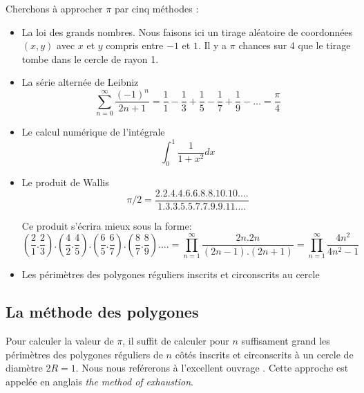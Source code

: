 \documentclass[11pt]{book}
\begin{document}
Cherchons à approcher $\pi$ par cinq méthodes :
\begin{itemize}
	\item La loi des grands nombres. 
	Nous faisons ici un tirage aléatoire de coordonnées $(x,y)$ avec $x$ et $y$ compris entre $-1$ et $1$.
	Il y a  $\pi$ chances sur 4 que le tirage tombe dans le cercle de rayon 1. 
		
	\item La série alternée de Leibniz 
	\[ \sum_{n=0}^\infty \frac{(-1)^n}{2n+1} = \frac{1}{1} -\frac{1}{3}+\frac{1}{5}-\frac{1}{7}+\frac{1}{9} - \dots = \frac{\pi}{4}  \]
	
	\item Le calcul numérique de l'intégrale 
	$$\int_0^1 \frac{1}{1+x^2} dx$$
	
	\item  Le produit de Wallis 
	\[ \pi /2 = \frac{2.2.4.4.6.6.8.8.10.10. ...} {1.3.3.5.5.7.7.9.9.11. ...}\]
	
	Ce produit s'écrira mieux sous la forme:
	\[ ( \frac{2}{1}.\frac{2}{3} ) . (\frac{4}{2}.\frac{4}{5} ).(\frac{6}{5}.\frac{6}{7} ).(\frac{8}{7}.\frac{8}{9} ) . ...  =  \prod_{n=1}^\infty \frac{2n.2n}{(2n-1).(2n+1)} = \prod_{n=1}^\infty \frac{4n^2}{4n^2-1}\]
	
	\item Les périmètres des polygones réguliers inscrits et circonscrits au cercle 
	\begin{figure}[H]
		\centering
		\usetikzlibrary{shapes.geometric}
		\end{figure}
	
\end{itemize}

\subsection{La méthode des polygones}	
Pour calculer la valeur de $\pi$, il suffit de calculer pour $n$ suffisament grand
les périmètres des polygones réguliers de $n$ côtés inscrits et circonscrits à un cercle de diamètre
$2R=1$. 
Nous nous reférerons à l'excellent ouvrage \cite{gb}.
Cette approche est appelée en anglais \textit{the method of exhaustion}.
\end{document}
